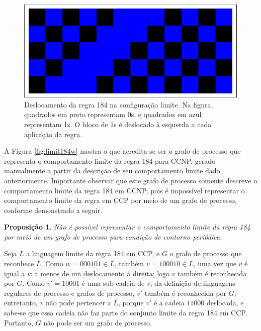 \documentclass[12pt,a4paper]{article}
\newtheorem{proposition}[theorem]{Proposição}
\newenvironment{proof}[1][Prova]{\begin{trivlist}
\item[\hskip \labelsep {\bfseries #1}]}{\end{trivlist}}
\begin{document}
\begin{figure}[htp]
\begin{center}
\includegraphics[scale=1.0]{img/shift.eps}
\caption[Deslocamento da regra 184 na configuração limite]
{Deslocamento da regra 184 na configuração limite. Na figura,
quadrados em preto representam 0s, e quadrados em azul representam 1s.
O bloco de 1s é deslocado à esquerda a cada aplicação da regra.}
\label{fig:shift}
\end{center}
\end{figure}

A Figura \ref{fig:limit184w} mostra o que acredita-se ser o grafo de processo
que representa o comportamento limite da regra 184 para CCNP, gerado manualmente
a partir da descrição de seu comportamento limite dado anteriormente.
Importante observar que este grafo de processo somente descreve o comportamento
limite da regra 184 em CCNP, pois é impossível representar o comportamento limite
da regra em CCP por meio de um grafo de processo, conforme demonstrado a seguir.

\begin{proposition}
Não é possível representar o comportamento limite da regra 184 por meio de
um grafo de processo para condição de contorno periódica.
\end{proposition}

\begin{proof}
Seja $L$ a linguagem limite da regra 184 em CCP, e $G$
o grafo de processo que reconhece $L$. Como
$w = 000101 \in L$, também $v = 100010 \in L$, uma vez que
$v$ é igual
a $w$ a menos de um deslocamento à direita; logo $v$ também é reconhecida por $G$.
Como $v' = 10001$ é uma sub-cadeia de $v$, da definição de
linguagens regulares de processo e grafos de processo, $v'$ também é
reconhecida por $G$; entretanto, $v$ não pode pertencer a $L$, porque $v'$ é
a cadeia $11000$ deslocada, e sabe-se que essa cadeia não
faz parte do conjunto limite da regra 184 em CCP. Portanto, $G$ não pode ser
um grafo de processo.
\end{proof}
\end{document}
